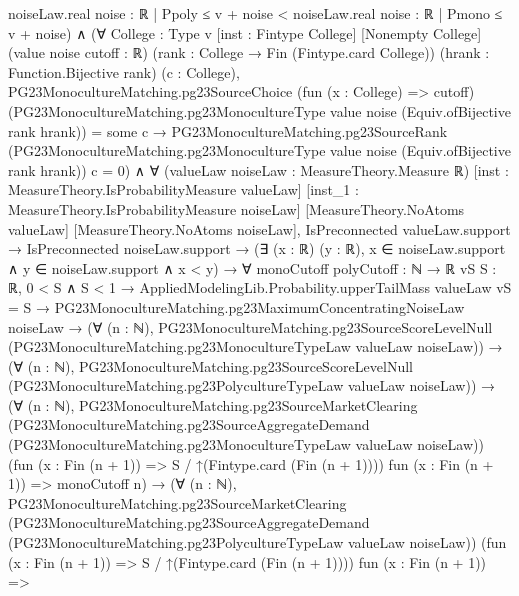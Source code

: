 \documentclass[10pt]{article}
\begin{document}
\begin{ReviewVerbatim}
                              noiseLaw.real {noise : ℝ | Ppoly ≤ v + noise} <
                                noiseLaw.real {noise : ℝ | Pmono ≤ v + noise}) ∧
  (∀ {College : Type v} [inst : Fintype College] [Nonempty College] (value noise cutoff : ℝ)
      (rank : College → Fin (Fintype.card College)) (hrank : Function.Bijective rank) (c : College),
      PG23MonocultureMatching.pg23SourceChoice (fun (x : College) => cutoff)
            (PG23MonocultureMatching.pg23MonocultureType value noise (Equiv.ofBijective rank hrank)) =
          some c →
        PG23MonocultureMatching.pg23SourceRank
            (PG23MonocultureMatching.pg23MonocultureType value noise (Equiv.ofBijective rank hrank)) c =
          0) ∧
    ∀ (valueLaw noiseLaw : MeasureTheory.Measure ℝ) [inst : MeasureTheory.IsProbabilityMeasure valueLaw]
      [inst_1 : MeasureTheory.IsProbabilityMeasure noiseLaw] [MeasureTheory.NoAtoms valueLaw]
      [MeasureTheory.NoAtoms noiseLaw],
      IsPreconnected valueLaw.support →
        IsPreconnected noiseLaw.support →
          (∃ (x : ℝ) (y : ℝ), x ∈ noiseLaw.support ∧ y ∈ noiseLaw.support ∧ x < y) →
            ∀ {monoCutoff polyCutoff : ℕ → ℝ} {vS S : ℝ},
              0 < S ∧ S < 1 →
                AppliedModelingLib.Probability.upperTailMass valueLaw vS = S →
                  PG23MonocultureMatching.pg23MaximumConcentratingNoiseLaw noiseLaw →
                    (∀ (n : ℕ),
                        PG23MonocultureMatching.pg23SourceScoreLevelNull
                          (PG23MonocultureMatching.pg23MonocultureTypeLaw valueLaw noiseLaw)) →
                      (∀ (n : ℕ),
                          PG23MonocultureMatching.pg23SourceScoreLevelNull
                            (PG23MonocultureMatching.pg23PolycultureTypeLaw valueLaw noiseLaw)) →
                        (∀ (n : ℕ),
                            PG23MonocultureMatching.pg23SourceMarketClearing
                              (PG23MonocultureMatching.pg23SourceAggregateDemand
                                (PG23MonocultureMatching.pg23MonocultureTypeLaw valueLaw noiseLaw))
                              (fun (x : Fin (n + 1)) => S / ↑(Fintype.card (Fin (n + 1)))) fun (x : Fin (n + 1)) =>
                              monoCutoff n) →
                          (∀ (n : ℕ),
                              PG23MonocultureMatching.pg23SourceMarketClearing
                                (PG23MonocultureMatching.pg23SourceAggregateDemand
                                  (PG23MonocultureMatching.pg23PolycultureTypeLaw valueLaw noiseLaw))
                                (fun (x : Fin (n + 1)) => S / ↑(Fintype.card (Fin (n + 1)))) fun (x : Fin (n + 1)) =>

\end{ReviewVerbatim}
\end{document}
